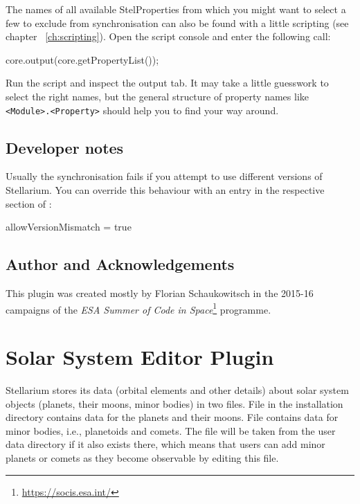 The names of all available StelProperties from which you might want to select a few to exclude  
from synchronisation can also be found with a little scripting (see chapter ~\ref{ch:scripting}). 
Open the script console  and enter the following call:
\begin{script}
core.output(core.getPropertyList());
\end{script}
Run the script and inspect the output tab. It may take a little guesswork to select the right names, 
but the general structure of property names like 
\texttt{<Module>.<Property>} should help you to find your way around.

\subsection{Developer notes}

Usually the synchronisation fails if you attempt to use different
versions of Stellarium. You can override this behaviour
 with an entry in the respective section of
:

\begin{configfile}
  [RemoteSync]
  allowVersionMismatch = true
\end{configfile}

\subsection*{Author and Acknowledgements}

This plugin was created mostly by Florian Schaukowitsch in the 2015-16 campaigns of the 
\emph{ESA Summer of Code in Space}\footnote{\url{https://socis.esa.int/}} programme. 

% 


\newpage

\section{Solar System Editor Plugin}
\label{sec:plugins:SolarSystemEditor}

Stellarium stores its data (orbital elements and other details) about
solar system objects (planets, their moons, minor bodies) in two files.  
File  in the installation directory contains data for the planets and their moons.
File  contains data for minor bodies, i.e., planetoids and comets.
The file will be taken from the user data directory if it also exists there, which means that users can add minor planets or comets as they become observable by editing this file.


